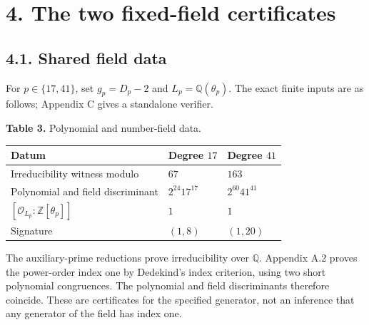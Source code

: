 \documentclass[11pt,a4paper]{article}
\newcounter{none}
\begin{document}
\section{4. The two fixed-field certificates}\label{fixed-fields}

\subsection{4.1. Shared field data}\label{field-data}

For \(p\in\{17,41\}\), set \(g_p=D_p-2\) and
\(L_p=\mathbb Q(\theta_p)\). The exact finite inputs are as follows;
Appendix C gives a standalone verifier.

\textbf{Table 3.} Polynomial and number-field data.

{\def\LTcaptype{none} %
\begin{longtable}[]{@{}
  >{\raggedright\arraybackslash}p{}
  >{\centering\arraybackslash}p{}
  >{\centering\arraybackslash}p{}@{}}
\toprule\noalign{}
\begin{minipage}[b]{\linewidth}\raggedright
Datum
\end{minipage} & \begin{minipage}[b]{\linewidth}\centering
Degree \(17\)
\end{minipage} & \begin{minipage}[b]{\linewidth}\centering
Degree \(41\)
\end{minipage} \\
\midrule\noalign{}
\endhead
\bottomrule\noalign{}
\endlastfoot
Irreducibility witness modulo & \(67\) & \(163\) \\
Polynomial and field discriminant & \(2^{24}17^{17}\) &
\(2^{60}41^{41}\) \\
\([\mathcal O_{L_p}:\mathbb Z[\theta_p]]\) & \(1\) & \(1\) \\
Signature & \((1,8)\) & \((1,20)\) \\
\end{longtable}
}

The auxiliary-prime reductions prove irreducibility over \(\mathbb Q\).
Appendix A.2 proves the power-order index one by Dedekind's index
criterion, using two short polynomial congruences. The polynomial and
field discriminants therefore coincide. These are certificates for the
specified generator, not an inference that any generator of the field
has index one.
\end{document}
